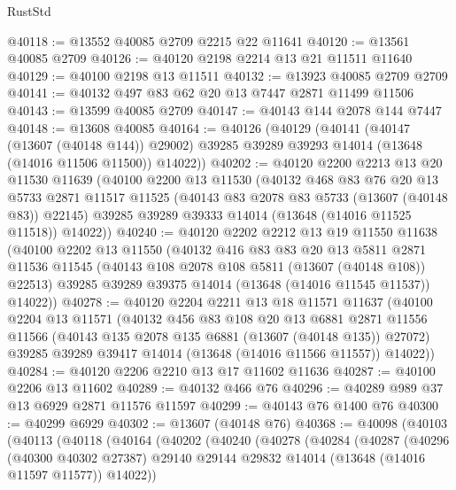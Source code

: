\begin{lexlean}{RustStd}
\begin{coremodule}
@40118 := @13552 @40085 @2709 @2215 @22 @11641
@40120 := @13561 @40085 @2709
@40126 := @40120 @2198 @2214 @13 @21 @11511 @11640
@40129 := @40100 @2198 @13 @11511
@40132 := @13923 @40085 @2709 @2709
@40141 := @40132 @497 @83 @62 @20 @13 @7447 @2871 @11499 @11506
@40143 := @13599 @40085 @2709
@40147 := @40143 @144 @2078 @144 @7447
@40148 := @13608 @40085
@40164 := @40126
    (@40129
      (@40141
        (@40147 (@13607 (@40148 @144)) @29002)
        @39285
        @39289
        @39293
        @14014
        (@13648 (@14016 @11506 @11500))
        @14022))
@40202 := @40120
    @2200
    @2213
    @13
    @20
    @11530
    @11639
    (@40100
      @2200
      @13
      @11530
      (@40132
        @468
        @83
        @76
        @20
        @13
        @5733
        @2871
        @11517
        @11525
        (@40143 @83 @2078 @83 @5733 (@13607 (@40148 @83)) @22145)
        @39285
        @39289
        @39333
        @14014
        (@13648 (@14016 @11525 @11518))
        @14022))
@40240 := @40120
    @2202
    @2212
    @13
    @19
    @11550
    @11638
    (@40100
      @2202
      @13
      @11550
      (@40132
        @416
        @83
        @83
        @20
        @13
        @5811
        @2871
        @11536
        @11545
        (@40143 @108 @2078 @108 @5811 (@13607 (@40148 @108)) @22513)
        @39285
        @39289
        @39375
        @14014
        (@13648 (@14016 @11545 @11537))
        @14022))
@40278 := @40120
    @2204
    @2211
    @13
    @18
    @11571
    @11637
    (@40100
      @2204
      @13
      @11571
      (@40132
        @456
        @83
        @108
        @20
        @13
        @6881
        @2871
        @11556
        @11566
        (@40143 @135 @2078 @135 @6881 (@13607 (@40148 @135)) @27072)
        @39285
        @39289
        @39417
        @14014
        (@13648 (@14016 @11566 @11557))
        @14022))
@40284 := @40120 @2206 @2210 @13 @17 @11602 @11636
@40287 := @40100 @2206 @13 @11602
@40289 := @40132 @466 @76
@40296 := @40289 @989 @37 @13 @6929 @2871 @11576 @11597
@40299 := @40143 @76 @1400 @76
@40300 := @40299 @6929
@40302 := @13607 (@40148 @76)
@40368 := @40098
    (@40103
      (@40113
        (@40118
          (@40164
            (@40202
              (@40240
                (@40278
                  (@40284
                    (@40287
                      (@40296
                        (@40300 @40302 @27387)
                        @29140
                        @29144
                        @29832
                        @14014
                        (@13648 (@14016 @11597 @11577))
                        @14022))

\end{coremodule}
\end{lexlean}
